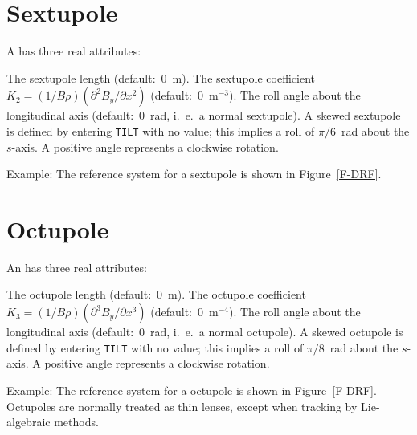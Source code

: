 \section{Sextupole}
\label{S-SEXT}
A  has three real attributes:
\begin{mylist}
The sextupole length (default:~0~m).
The sextupole coefficient
\(K_{2}=(1/B\rho) (\partial^{2} B_{y}/\partial x^{2})\)
(default:~0~\(\mathrm{m}^{-3}\)).
The roll angle about the longitudinal axis (default:~0~rad,
i.~e.~a normal sextupole).
A skewed sextupole is defined by entering {\tt TILT} with no value;
this implies a roll of \(\pi/6\)~rad about the \(s\)-axis.
A positive angle represents a clockwise rotation.
\end{mylist}
Example:
The reference system for a sextupole is shown in Figure~\ref{F-DRF}.
 
\section{Octupole}
\label{S-OCT}
An  has three real attributes:
\begin{mylist}
The octupole length (default:~0~m).
The octupole coefficient
\(K_{3}=(1/B\rho) (\partial^{3} B_{y}/\partial x^{3})\)
(default:~0~\(\mathrm{m}^{-4}\)).
The roll angle about the longitudinal axis (default:~0~rad,
i.~e.~a normal octupole).
A skewed octupole is defined by entering {\tt TILT} with no value;
this implies a roll of \(\pi/8\)~rad about the \(s\)-axis.
A positive angle represents a clockwise rotation.
\end{mylist}
Example:
The reference system for a octupole is shown in Figure~\ref{F-DRF}.
Octupoles are normally treated as thin lenses,
except when tracking by Lie-algebraic methods.
 
